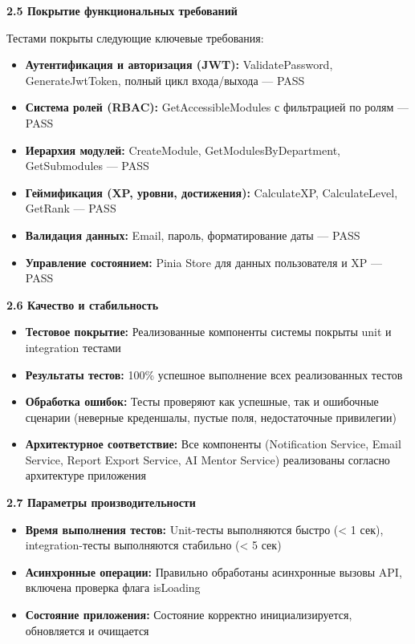 \textbf{2.5 Покрытие функциональных требований}

Тестами покрыты следующие ключевые требования:

\begin{itemize}
	\item \textbf{Аутентификация и авторизация (JWT):} ValidatePassword, GenerateJwtToken, полный цикл входа/выхода --- PASS
	\item \textbf{Система ролей (RBAC):} GetAccessibleModules с фильтрацией по ролям --- PASS
	\item \textbf{Иерархия модулей:} CreateModule, GetModulesByDepartment, GetSubmodules --- PASS
	\item \textbf{Геймификация (XP, уровни, достижения):} CalculateXP, CalculateLevel, GetRank --- PASS
	\item \textbf{Валидация данных:} Email, пароль, форматирование даты --- PASS
	\item \textbf{Управление состоянием:} Pinia Store для данных пользователя и XP --- PASS
\end{itemize}

\textbf{2.6 Качество и стабильность}

\begin{itemize}
	\item \textbf{Тестовое покрытие:} Реализованные компоненты системы покрыты unit и integration тестами
	\item \textbf{Результаты тестов:} 100\% успешное выполнение всех реализованных тестов
	\item \textbf{Обработка ошибок:} Тесты проверяют как успешные, так и ошибочные сценарии (неверные креденшалы, пустые поля, недостаточные привилегии)
	\item \textbf{Архитектурное соответствие:} Все компоненты (Notification Service, Email Service, Report Export Service, AI Mentor Service) реализованы согласно архитектуре приложения
\end{itemize}

\textbf{2.7 Параметры производительности}

\begin{itemize}
	\item \textbf{Время выполнения тестов:} Unit-тесты выполняются быстро (< 1 сек), integration-тесты выполняются стабильно (< 5 сек)
	\item \textbf{Асинхронные операции:} Правильно обработаны асинхронные вызовы API, включена проверка флага isLoading
	\item \textbf{Состояние приложения:} Состояние корректно инициализируется, обновляется и очищается
\end{itemize}

